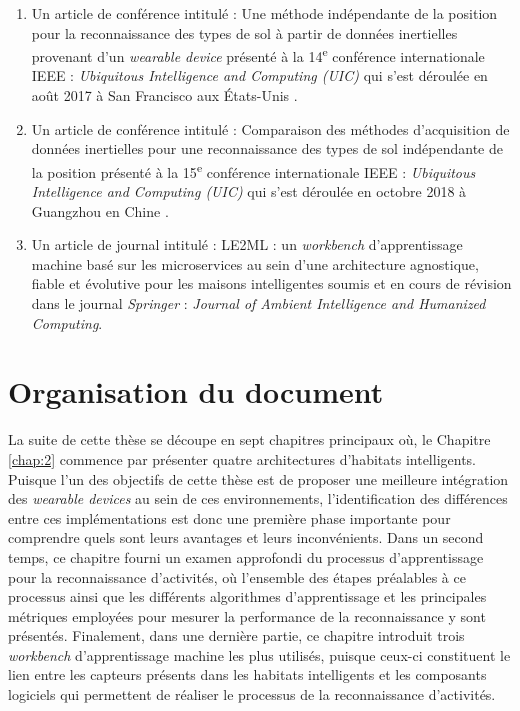 {{\begin{enumerate}
	\item
		\label{pub:1}
		Un article de conférence intitulé : \og Une méthode indépendante de la position pour la reconnaissance des types de sol à partir de données inertielles provenant d'un \textit{wearable device} \fg présenté à la 14\textsuperscript{e} conférence internationale IEEE : \textit{Ubiquitous Intelligence and Computing (UIC)} qui s'est déroulée en août 2017 à San Francisco aux États-Unis \citep{Thullier2017}.
	\item
		\label{pub:2}
		Un article de conférence intitulé : \og Comparaison des méthodes d'acquisition de données inertielles pour une reconnaissance des types de sol indépendante de la position \fg présenté à la 15\textsuperscript{e} conférence internationale IEEE : \textit{Ubiquitous Intelligence and Computing (UIC)} qui s'est déroulée en octobre 2018 à Guangzhou en Chine \citep{Thullier2018}.
	\item
		\label{pub:3}
		Un article de journal intitulé : \og LE2ML : un \textit{workbench} d'apprentissage machine basé sur les microservices au sein d'une architecture agnostique, fiable et évolutive pour les maisons intelligentes \fg soumis et en cours de révision dans le journal \textit{Springer} : \textit{Journal of Ambient Intelligence and Humanized Computing}.
\end{enumerate}

\section{Organisation du document}

La suite de cette thèse se découpe en sept chapitres principaux où, le Chapitre \ref{chap:2} commence par présenter quatre architectures d'habitats intelligents. Puisque l'un des objectifs de cette thèse est de proposer une meilleure intégration des \textit{wearable devices} au sein de ces environnements, l'identification des différences entre ces implémentations est donc une première phase importante pour comprendre quels sont leurs avantages et leurs inconvénients. Dans un second temps, ce chapitre fourni un examen approfondi du processus d'apprentissage pour la reconnaissance d'activités, où l'ensemble des étapes préalables à ce processus ainsi que les différents algorithmes d'apprentissage et les principales métriques employées pour mesurer la performance de la reconnaissance y sont présentés. Finalement, dans une dernière partie, ce chapitre introduit trois \textit{workbench} d'apprentissage machine les plus utilisés, puisque ceux-ci constituent le lien entre les capteurs présents dans les habitats intelligents et les composants logiciels qui permettent de réaliser le processus de la reconnaissance d'activités.

}}
